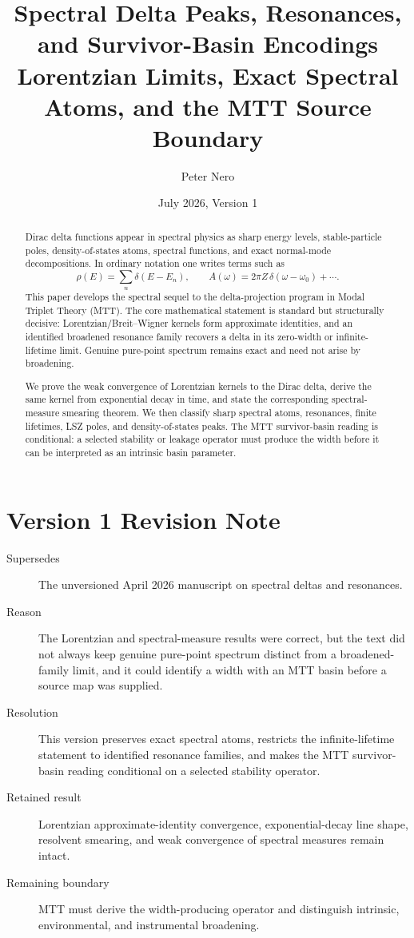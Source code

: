 \documentclass[11pt]{article}
\title{Spectral Delta Peaks, Resonances, and Survivor-Basin Encodings\\
\large Lorentzian Limits, Exact Spectral Atoms, and the MTT Source Boundary}
\author{Peter Nero}
\date{July 2026, Version 1}
\begin{document}
\maketitle

\begin{abstract}
Dirac delta functions appear in spectral physics as sharp energy levels, stable-particle poles, density-of-states atoms, spectral functions, and exact normal-mode decompositions. In ordinary notation one writes terms such as
\[
\rho(E)=\sum_n \delta(E-E_n),
\qquad
A(\omega)=2\pi Z\,\delta(\omega-\omega_0)+\cdots .
\]
This paper develops the spectral sequel to the delta-projection program in Modal Triplet Theory (MTT). The core mathematical statement is standard but structurally decisive: Lorentzian/Breit--Wigner kernels form approximate identities, and an identified broadened resonance family recovers a delta in its zero-width or infinite-lifetime limit. Genuine pure-point spectrum remains exact and need not arise by broadening.

We prove the weak convergence of Lorentzian kernels to the Dirac delta, derive the same kernel from exponential decay in time, and state the corresponding spectral-measure smearing theorem. We then classify sharp spectral atoms, resonances, finite lifetimes, LSZ poles, and density-of-states peaks. The MTT survivor-basin reading is conditional: a selected stability or leakage operator must produce the width before it can be interpreted as an intrinsic basin parameter.
\end{abstract}

\section*{Version 1 Revision Note}
\begin{description}
\item[Supersedes] The unversioned April 2026 manuscript on spectral deltas and resonances.
\item[Reason] The Lorentzian and spectral-measure results were correct, but the text did
not always keep genuine pure-point spectrum distinct from a broadened-family limit, and it
could identify a width with an MTT basin before a source map was supplied.
\item[Resolution] This version preserves exact spectral atoms, restricts the
infinite-lifetime statement to identified resonance families, and makes the MTT
survivor-basin reading conditional on a selected stability operator.
\item[Retained result] Lorentzian approximate-identity convergence, exponential-decay
line shape, resolvent smearing, and weak convergence of spectral measures remain intact.
\item[Remaining boundary] MTT must derive the width-producing operator and distinguish
intrinsic, environmental, and instrumental broadening.
\end{description}
\end{document}
